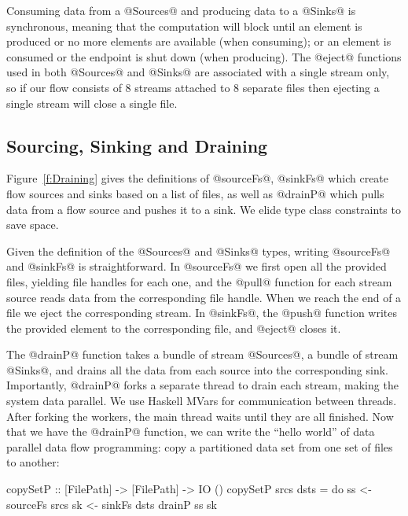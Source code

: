 Consuming data from a @Sources@ and producing data to a @Sinks@ is synchronous, meaning that the computation will block until an element is produced or no more elements are available (when consuming); or an element is consumed or the endpoint is shut down (when producing). The @eject@ functions used in both @Sources@ and @Sinks@ are associated with a single stream only, so if our flow consists of 8 streams attached to 8 separate files then ejecting a single stream will close a single file.


\subsection{Sourcing, Sinking and Draining}
Figure~\ref{f:Draining} gives the definitions of @sourceFs@, @sinkFs@ which create flow sources and sinks based on a list of files, as well as @drainP@ which pulls data from a flow source and pushes it to a sink. We elide type class constraints to save space.

Given the definition of the @Sources@ and @Sinks@ types, writing @sourceFs@ and @sinkFs@ is straightforward. In @sourceFs@ we first open all the provided files, yielding file handles for each one, and the @pull@ function for each stream source reads data from the corresponding file handle. When we reach the end of a file we eject the corresponding stream. In @sinkFs@, the @push@ function writes the provided element to the corresponding file, and @eject@ closes it.

The @drainP@ function takes a bundle of stream @Sources@, a bundle of stream @Sinks@, and drains all the data from each source into the corresponding sink. Importantly, @drainP@ forks a separate thread to drain each stream, making the system data parallel. We use Haskell MVars for communication between threads. After forking the workers, the main thread waits until they are all finished. Now that we have the @drainP@ function, we can write the ``hello world'' of data parallel data flow programming: copy a partitioned data set from one set of files to another:
\begin{code}
 copySetP :: [FilePath] -> [FilePath] -> IO ()
 copySetP srcs dsts
  = do  ss <- sourceFs srcs
        sk <- sinkFs   dsts
        drainP ss sk
\end{code}

